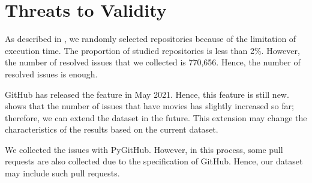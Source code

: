 \section{Threats to Validity}
\label{sec:limitation}

As described in , we randomly selected 
repositories because of the limitation of execution time. 
The proportion of studied repositories is less than 2\%. 
However, the number of resolved issues that 
we collected is 770,656. 
Hence, the number of resolved issues is enough. 

GitHub has released the feature in May 2021. 
Hence, this feature is still new. 
 shows that the number of 
issues that have movies has slightly increased so far; 
therefore, we can extend the dataset in the future. 
This extension may change the characteristics of 
the results based on the current dataset. 

We collected the issues with PyGitHub. 
However, in this process, some pull requests 
are also collected due to the specification of GitHub. 
Hence, our dataset may include such pull requests. 